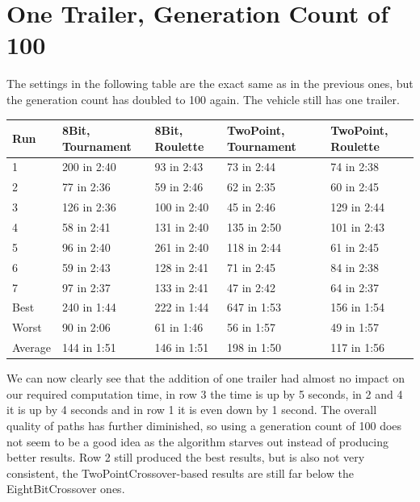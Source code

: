 \section{One Trailer, Generation Count of 100}
\label{sec:no_trailer_100}

The settings in the following table are the exact same as in the previous ones, but the generation count has doubled to 100 again. The vehicle still has one trailer.

\begin{center}
	\begin{tabular}{| l | l | l | p{3cm} | p{3cm}|}
		\hline
		Run 		& 8Bit, Tournament 	& 8Bit, Roulette 	& TwoPoint, Tournament 	& TwoPoint, Roulette	\\ \hline
		1				& 200 in 2:40				& 93 in 2:43			& 73 in 2:44						& 74 in 2:38					\\ \hline
		2				& 77 in 2:36				& 59 in 2:46			& 62 in 2:35						& 60 in 2:45					\\ \hline
		3				& 126 in 2:36				& 100 in 2:40			& 45 in 2:46						& 129 in 2:44					\\ \hline
		4				& 58 in 2:41				& 131 in 2:40			& 135 in 2:50						& 101 in 2:43					\\ \hline
		5				& 96 in 2:40				& 261 in 2:40			& 118 in 2:44						& 61 in 2:45					\\ \hline
		6				& 59 in 2:43				& 128 in 2:41			& 71 in 2:45						& 84 in 2:38					\\ \hline
		7				& 97 in 2:37				& 133 in 2:41			& 47 in 2:42						& 64 in 2:37					\\ \hline
		Best		&	240 in 1:44				&	222 in 1:44			&	647 in 1:53						&	156 in 1:54					\\ \hline
		Worst		&	90 in 2:06				&	61 in 1:46			&	56 in 1:57						& 49 in 1:57					\\ \hline
		Average	&	144 in 1:51				& 146 in 1:51			& 198 in 1:50						&	117 in 1:56					\\ \hline
		\hline
	\end{tabular}
\end{center}

We can now clearly see that the addition of one trailer had almost no impact on our required computation time, in row 3 the time is up by 5 seconds, in 2 and 4 it is up by 4 seconds and in row 1 it is even down by 1 second. The overall quality of paths has further diminished, so using a generation count of 100 does not seem to be a good idea as the algorithm starves out instead of producing better results. Row 2 still produced the best results, but is also not very consistent, the TwoPointCrossover-based results are still far below the EightBitCrossover ones.

